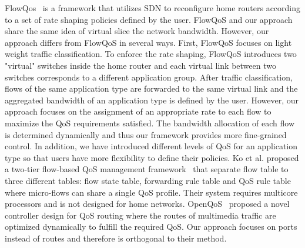 FlowQos~\cite{Seddiki_HotSDN14} is a framework that utilizes SDN to reconfigure home routers according to a set of rate shaping
policies defined by the user. FlowQoS and our approach share the same idea of virtual slice the network bandwidth. However,
our approach differs from FlowQoS in several ways. First, FlowQoS focuses on light weight traffic classification. To enforce
the rate shaping, FlowQoS introduces two "virtual" switches inside the home router and each virtual link between two switches 
corresponds to a different application group. After traffic classification, flows of the same application type are forwarded to
the same virtual link and the aggregated bandwidth of an application type is defined by the user. However, our approach focuses
on the assignment of an appropriate rate to each flow to maximize the QoS requirements satisfied. The bandwidth allocation of each
flow is determined dynamically and thus our framework provides more fine-grained control. In addition, we have introduced different
levels of QoS for an application type so that users have more flexibility to define their policies. Ko et al. proposed a two-tier
flow-based QoS management framework~\cite{Ko_IEICE13} that separate flow table to three different tables: flow state table, forwarding
rule table and QoS rule table where micro-flows can share a single QoS profile. Their system requires multicore processors and is
not designed for home networks. OpenQoS~\cite{Egilmez_ASPIPA12} proposed a novel controller design for QoS routing where the routes of
multimedia traffic are optimized dynamically to fulfill the required QoS. Our approach focuses on ports instead of routes and therefore
is orthogonal to their method.
